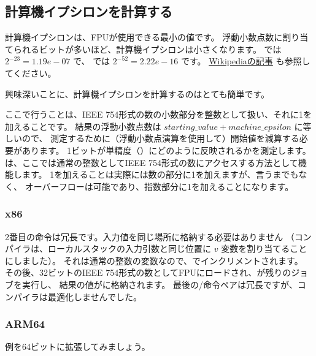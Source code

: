 ﻿\subsection{計算機イプシロンを計算する}

計算機イプシロンは、\ac{FPU}が使用できる最小の値です。 
浮動小数点数に割り当てられるビットが多いほど、計算機イプシロンは小さくなります。
\Tfloat では $2^{-23} = 1.19e-07$ で、 \Tdouble では $2^{-52} = 2.22e-16$ です。
\href{http://link.yurichev.com/17367}{Wikipediaの記事} も参照してください。

興味深いことに、計算機イプシロンを計算するのはとても簡単です。



ここで行うことは、IEEE 754形式の数の小数部分を整数として扱い、それに1を加えることです。
結果の浮動小数点数は $starting\_value+machine\_epsilon$ に等しいので、
測定するために（浮動小数点演算を使用して）開始値を減算する必要があります。
1ビットが単精度（\Tfloat）にどのように反映されるかを測定します。
は、ここでは通常の整数としてIEEE 754形式の数にアクセスする方法として機能します。 
1を加えることは実際には数の部分に1を加えますが、言うまでもなく、
オーバーフローは可能であり、指数部分に1を加えることになります。

\subsubsection{x86}



2番目の命令は冗長です。入力値を同じ場所に格納する必要はありません
（コンパイラは、ローカルスタックの入力引数と同じ位置に $v$ 変数を割り当てることにしました）。
それは通常の整数の変数なので、でインクリメントされます。 
その後、32ビットのIEEE 754形式の数としてFPUにロードされ、が残りのジョブを実行し、
結果の値がに格納されます。 
最後の/命令ペアは冗長ですが、コンパイラは最適化しませんでした。

\subsubsection{ARM64}

例を64ビットに拡張してみましょう。



